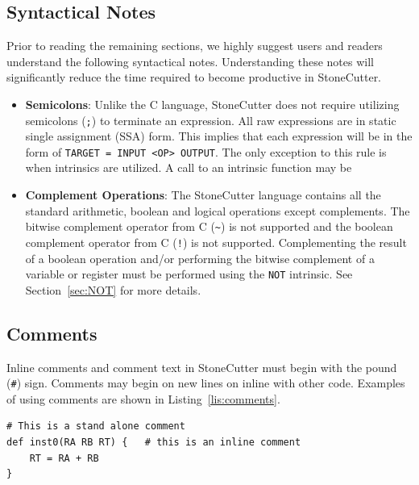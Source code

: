 \documentclass{article}
\begin{document}
\subsection{Syntactical Notes}
\label{sec:SyntacticalNotes}

Prior to reading the remaining sections, we highly suggest users and readers 
understand the following syntactical notes.  Understanding these notes will significantly 
reduce the time required to become productive in StoneCutter.  

\begin{itemize}
\item \textbf{Semicolons}: Unlike the C language, StoneCutter does not require utilizing semicolons (\texttt{;}) 
to terminate an expression.  All raw expressions are in static single assignment (SSA) form.  This implies 
that each expression will be in the form of \texttt{TARGET = INPUT <OP> OUTPUT}.  The only exception 
to this rule is when intrinsics are utilized.  A call to an intrinsic function may be

\item \textbf{Complement Operations}: The StoneCutter language contains all the standard arithmetic, boolean 
and logical operations except complements.  The bitwise complement operator from C (\texttt{\~}) is not supported 
and the boolean complement operator from C (\texttt{!}) is not supported.  Complementing the result of a boolean 
operation and/or performing the bitwise complement of a variable or register must be performed using the \texttt{NOT} 
intrinsic.  See Section~\ref{sec:NOT} for more details.   
\end{itemize}

\clearpage
\subsection{Comments}
\label{sec:Comments}

Inline comments and comment text in StoneCutter must begin with the pound (\texttt{\#}) sign.  Comments 
may begin on new lines on inline with other code.  Examples of using comments are shown in Listing~\ref{lis:comments}.  

\vspace{0.125in}
\begin{lstlisting}[frame=single,style=base,caption={StoneCutter Comments},captionpos=b,label={lis:comments}]
# This is a stand alone comment
def inst0(RA RB RT) {   # this is an inline comment
	RT = RA + RB
}
\end{lstlisting}
\end{document}
